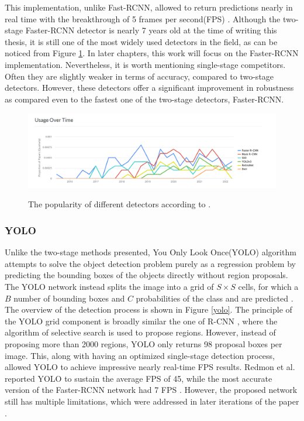 \documentclass[english, 12pt, a4paper, elec, utf8, a-1b, online]{aaltothesis}
\begin{document}
This implementation, unlike Fast-RCNN, allowed to return predictions nearly in real time with the breakthrough of 5 frames per second(FPS) \cite{ima}.
Although the two-stage Faster-RCNN detector is nearly 7 years old at the time of writing this thesis, it is still one of the most widely used detectors in the field, as can be noticed from Figure \ref{popularity}. In later chapters, this work will focus on the Faster-RCNN implementation. Nevertheless, it is worth mentioning single-stage competitors. Often they are slightly weaker in terms of accuracy, compared to two-stage detectors. However, these detectors offer a significant improvement in robustness as compared even to the fastest one of the two-stage detectors, Faster-RCNN. 

\begin{figure}[htb]
	\begin{center}
		\includegraphics[width=14cm]{./detectorsPopularity.png}
	\end{center}
	\caption{The popularity of different detectors according to  \cite{paperswithcode_1:2022}.}
	\begin{center}
		\label{popularity}
	\end{center}
\end{figure}
\FloatBarrier


\subsubsection{YOLO}
\label{yolo_section} 

Unlike the two-stage methods presented, You Only Look Once(YOLO) \cite{Redmon2015a} algorithm attempts to solve the object detection problem purely as a regression problem by predicting the bounding boxes of the objects directly without region proposals. The YOLO network instead splits the image into a grid of $S\times S$ cells, for which a $B$ number of bounding boxes and $C$ probabilities of the class and  are predicted \cite{Redmon2015a}. The overview of the detection process is shown in Figure \ref{yolo}. The principle of the YOLO grid component is broadly similar the one of R-CNN \cite{Girshick2013}, where the algorithm of selective search \cite{Uijlings13} is used to propose regions. However, instead of proposing more than 2000 regions, YOLO only returns 98 proposal boxes per image. This, along with having an optimized single-stage detection process, allowed YOLO to achieve impressive nearly real-time FPS results. Redmon et al. reported YOLO to sustain the average FPS of 45, while the most accurate version of the Faster-RCNN network had 7 FPS \cite{Redmon2015a}. However, the proposed network still has multiple limitations, which were addressed in later iterations of the paper  \cite{Redmon2016, Redmon2018a}.
\end{document}

